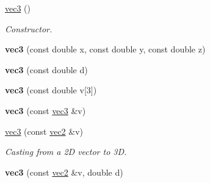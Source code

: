 \begin{DoxyCompactItemize}
\item 
\hypertarget{classutil_1_1math_1_1vec3_a947428533e7d4d35e51871e7d2b8b51a}{\hyperlink{classutil_1_1math_1_1vec3_a947428533e7d4d35e51871e7d2b8b51a}{vec3} ()}\label{classutil_1_1math_1_1vec3_a947428533e7d4d35e51871e7d2b8b51a}

\begin{DoxyCompactList}\small\item\em \-Constructor. \end{DoxyCompactList}\item 
\hypertarget{classutil_1_1math_1_1vec3_a58447a9fc69cc0ff2fba1aecf6b7c05f}{{\bfseries vec3} (const double x, const double y, const double z)}\label{classutil_1_1math_1_1vec3_a58447a9fc69cc0ff2fba1aecf6b7c05f}

\item 
\hypertarget{classutil_1_1math_1_1vec3_aa7589bf7977bbdb34cd017cbd54f618a}{{\bfseries vec3} (const double d)}\label{classutil_1_1math_1_1vec3_aa7589bf7977bbdb34cd017cbd54f618a}

\item 
\hypertarget{classutil_1_1math_1_1vec3_a47460f0b21a74011595c992320c2fc0b}{{\bfseries vec3} (const double v\mbox{[}3\mbox{]})}\label{classutil_1_1math_1_1vec3_a47460f0b21a74011595c992320c2fc0b}

\item 
\hypertarget{classutil_1_1math_1_1vec3_a9a63e151f3627c80c68fc3c254c78a34}{{\bfseries vec3} (const \hyperlink{classutil_1_1math_1_1vec3}{vec3} \&v)}\label{classutil_1_1math_1_1vec3_a9a63e151f3627c80c68fc3c254c78a34}

\end{DoxyCompactItemize}

{\bf }\par
\begin{DoxyCompactItemize}
\item 
\hypertarget{classutil_1_1math_1_1vec3_a8a3836e36c8012d2fdde753644574508}{\hyperlink{classutil_1_1math_1_1vec3_a8a3836e36c8012d2fdde753644574508}{vec3} (const \hyperlink{classutil_1_1math_1_1vec2}{vec2} \&v)}\label{classutil_1_1math_1_1vec3_a8a3836e36c8012d2fdde753644574508}

\begin{DoxyCompactList}\small\item\em \-Casting from a 2\-D vector to 3\-D. \end{DoxyCompactList}\item 
\hypertarget{classutil_1_1math_1_1vec3_a4a4505f01fe537b644f7e1f8679e5703}{{\bfseries vec3} (const \hyperlink{classutil_1_1math_1_1vec2}{vec2} \&v, double d)}\label{classutil_1_1math_1_1vec3_a4a4505f01fe537b644f7e1f8679e5703}

\end{DoxyCompactItemize}

